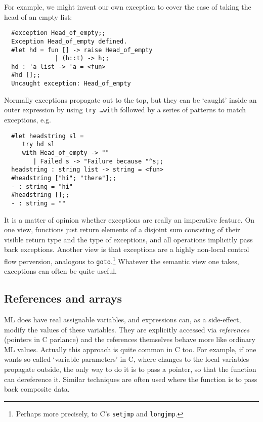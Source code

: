 For example, we might invent our own exception to cover the case of taking the
head of an empty list:

\begin{boxed}\begin{verbatim}
  #exception Head_of_empty;;
  Exception Head_of_empty defined.
  #let hd = fun [] -> raise Head_of_empty
              | (h::t) -> h;;
  hd : 'a list -> 'a = <fun>
  #hd [];;
  Uncaught exception: Head_of_empty
\end{verbatim}\end{boxed}

Normally exceptions propagate out to the top, but they can be `caught' inside
an outer expression by using {\tt try \ldots with} followed by a series of
patterns to match exceptions, e.g.

\begin{boxed}\begin{verbatim}
  #let headstring sl =
     try hd sl
     with Head_of_empty -> ""
        | Failed s -> "Failure because "^s;;
  headstring : string list -> string = <fun>
  #headstring ["hi"; "there"];;
  - : string = "hi"
  #headstring [];;
  - : string = ""
\end{verbatim}\end{boxed}

It is a matter of opinion whether exceptions are really an imperative feature.
On one view, functions just return elements of a disjoint sum consisting of
their visible return type and the type of exceptions, and all operations
implicitly pass back exceptions. Another view is that exceptions are a highly
non-local control flow perversion, analogous to {\tt goto}.\footnote{Perhaps
more precisely, to C's {\tt setjmp} and {\tt longjmp}.} Whatever the semantic
view one takes, exceptions can often be quite useful.

\subsection{References and arrays}

ML does have real assignable variables, and expressions can, as a side-effect,
modify the values of these variables. They are explicitly accessed via {\em
references} (pointers in C parlance) and the references themselves behave more
like ordinary ML values. Actually this approach is quite common in C too. For
example, if one wants so-called `variable parameters' in C, where changes to
the local variables propagate outside, the only way to do it is to pass a
pointer, so that the function can dereference it. Similar techniques are often
used where the function is to pass back composite data.

